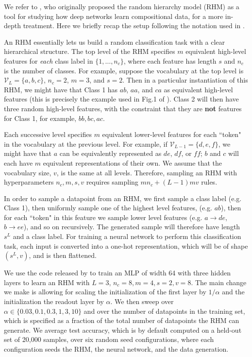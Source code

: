 \documentclass{article}
\theoremstyle{plain}
\theoremstyle{definition}
\theoremstyle{remark}
\begin{document}
We refer to \cite{petrini2023deep}, who originally proposed the random hierarchy model (RHM) as a tool for studying how deep networks learn compositional data, for a more in-depth treatment. Here we briefly recap the setup following the notation used in \cite{petrini2023deep}.

An RHM essentially lets us build a random classification task with a clear hierarchical structure. The top level of the RHM specifies $m$ equivalent high-level features for \textit{each} class label in $\{1,\ldots,n_c\}$, where each feature has length $s$ and $n_c$ is the number of classes. For example, suppose the vocabulary at the top level is $\mathcal{V}_L=\{a, b, c\}$, $n_c = 2$, $m=3$, and $s=2$. Then in a particular instantiation of this RHM, we might have that Class 1 has $ab$, $aa$, and $ca$ as equivalent high-level features (this is precisely the example used in Fig.1 of \cite{petrini2023deep}). Class 2 will then have three random high-level features, with the constraint that they are \textbf{not} features for Class 1, for example, $bb, bc, ac$.

Each successive level specifies $m$ equivalent lower-level features for each ``token" in the vocabulary at the previous level. For example, if $\mathcal{V}_{L-1}=\{d,e,f\}$, we might have that $a$ can be equivalently represented as $de$, $df$, or $ff$; $b$ and $c$ will each have $m$ equivalent representations of their own. We assume that the vocabulary size, $v$, is the same at all levels. Therefore, sampling an RHM with hyperparameters $n_c, m, s, v$ requires sampling $m n_c + (L-1) m v$ rules.

In order to sample a datapoint from an RHM, we first sample a class label (e.g. Class 1), then uniformly sample one of the highest level features, (e.g. $ab$), then for each ``token" in this feature we sample lower level features (e.g. $a \to de$, $b \to ee$), and so on recursively. The generated sample will therefore have length $s^L$ and a class label. For training a neural network to perform this classification task, each input is converted into a one-hot representation, which will be of shape $(s^L, v)$, and is then flattened.
 
We use the code released by \cite{petrini2023deep} to train an MLP of width 64 with three hidden layers to learn an RHM with $L=3$, $n_c=8, m=4, s=2, v=8$. The main change we make is allowing for scaling the initialization of the first layer by $1/\alpha$ and the initialization the readout layer by $\alpha$. We then sweep over $\alpha \in \{0.03, 0.1, 0.3, 1, 3, 10\}$ and over the number of datapoints in the training set, which is specified as a fraction of the total number of datapoints the RHM can generate. We average test accuracy, which is by default computed on a held-out set of 20,000 samples, over six random seed configurations, where each configuration seeds the RHM, the neural network, and the data generation. 
\end{document}
